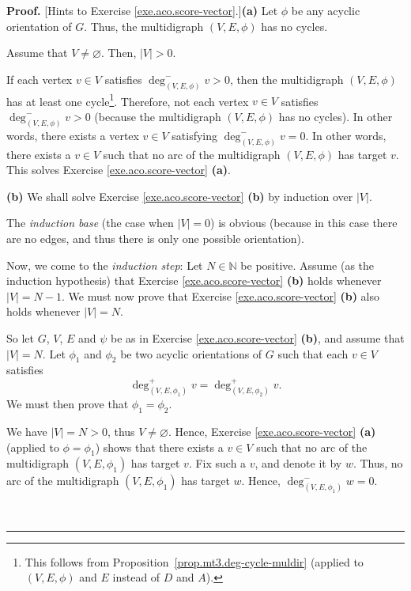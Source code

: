 \documentclass[numbers=enddot,12pt,final,onecolumn,notitlepage]{scrartcl}%
\theoremstyle{definition}
\newenvironment{proof}[1][Proof]{\noindent\textbf{#1.} }{\ \rule{0.5em}{0.5em}}
\newcommand{\tup}[1]{\left( #1 \right)}
\begin{document}
\begin{proof}
[Hints to Exercise \ref{exe.aco.score-vector}.]\textbf{(a)} Let $\phi$ be any
acyclic orientation of $G$. Thus, the multidigraph $\left(  V,E,\phi\right)  $
has no cycles.

Assume that $V\neq\varnothing$. Then, $\left\vert V\right\vert >0$.

If each vertex $v\in V$ satisfies $\deg_{\left(  V,E,\phi\right)  }^{-}v>0$,
then the multidigraph $\left(  V,E,\phi\right)  $ has at least one
cycle\footnote{This follows from
Proposition~\ref{prop.mt3.deg-cycle-muldir} (applied to
$\tup{V, E, \phi}$ and $E$ instead of $D$ and $A$).}.
Therefore, not each vertex $v\in V$ satisfies $\deg_{\left(
V,E,\phi\right)  }^{-}v>0$ (because the multidigraph $\left(  V,E,\phi\right)
$ has no cycles). In other words, there exists a vertex $v\in V$ satisfying
$\deg_{\left(  V,E,\phi\right)  }^{-}v=0$. In other words, there exists a
$v\in V$ such that no arc of the multidigraph $\left(  V,E,\phi\right)  $ has
target $v$. This solves Exercise \ref{exe.aco.score-vector} \textbf{(a)}.

\textbf{(b)} We shall solve Exercise \ref{exe.aco.score-vector} \textbf{(b)}
by induction over $\left\vert V\right\vert $.

The \textit{induction base} (the case when $\left\vert V\right\vert =0$) is
obvious (because in this case there are no edges, and thus there is only one
possible orientation).

Now, we come to the \textit{induction step}: Let $N\in\mathbb{N}$ be positive.
Assume (as the induction hypothesis) that Exercise \ref{exe.aco.score-vector}
\textbf{(b)} holds whenever $\left\vert V\right\vert =N-1$. We must now prove
that Exercise \ref{exe.aco.score-vector} \textbf{(b)} also holds whenever
$\left\vert V\right\vert =N$.

So let $G$, $V$, $E$ and $\psi$ be as in Exercise \ref{exe.aco.score-vector}
\textbf{(b)}, and assume that $\left\vert V\right\vert =N$. Let $\phi_{1}$ and
$\phi_{2}$ be two acyclic orientations of $G$ such that each $v\in V$
satisfies
\begin{equation}
\deg_{\left(  V,E,\phi_{1}\right)  }^{+}v=\deg_{\left(  V,E,\phi_{2}\right)
}^{+}v. \label{sol.aco.score-vector.b.1}%
\end{equation}
We must then prove that $\phi_{1}=\phi_{2}$.

We have $\left\vert V\right\vert =N>0$, thus $V\neq\varnothing$. Hence,
Exercise \ref{exe.aco.score-vector} \textbf{(a)} (applied to $\phi=\phi_{1}$)
shows that there exists a $v\in V$ such that no arc of the multidigraph
$\left(  V,E,\phi_{1}\right)  $ has target $v$. Fix such a $v$, and denote it
by $w$. Thus, no arc of the multidigraph $\left(  V,E,\phi_{1}\right)  $ has
target $w$. Hence, $\deg_{\left(  V,E,\phi_{1}\right)  }^{-}w=0$.


\end{proof}
\end{document}
